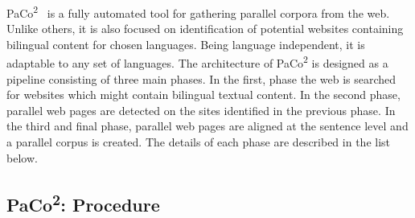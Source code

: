 PaCo\textsuperscript{2}~\cite{Vincente12} is a fully automated tool for gathering parallel corpora from the web. Unlike others, it is also focused on identification of potential websites containing bilingual content for chosen languages. Being language independent, it is adaptable to any set of languages. The architecture of PaCo\textsuperscript{2} is designed as a pipeline consisting of three main phases. In the first, phase the web is searched for websites which might contain bilingual textual content. In the second phase, parallel web pages are detected on the sites identified in the previous phase. In the third and final phase, parallel web pages are aligned at the sentence level and a parallel corpus is created. The details of each phase are described in the list below.

\subsection{PaCo\textsuperscript{2}: Procedure}
\label{subsection:paco2_procedure}

